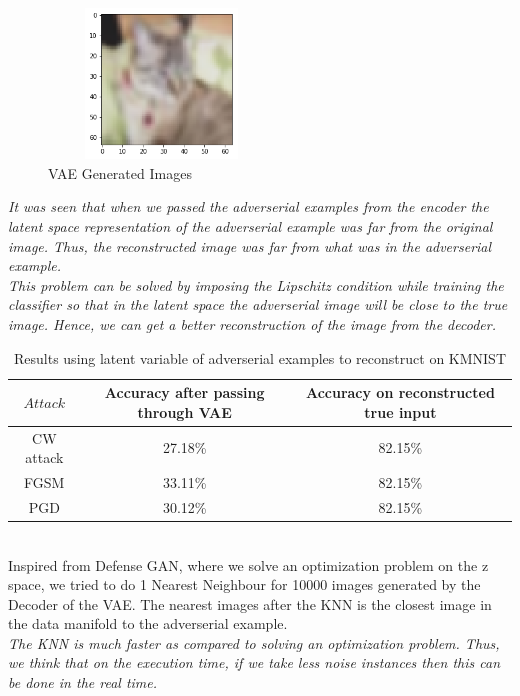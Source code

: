 \documentclass[11pt]{article}
\begin{document}
\begin{center}
        \begin{figure}[!h]
        \centering
          \includegraphics[width=60mm, height=40mm]{vae_cifar10_1.png}
          \caption{ VAE Generated Images
          }
          \label{fig:Piston}
        \end{figure}
\end{center}
\emph{It was seen that when we passed the adverserial examples from the encoder the latent space representation of the adverserial example was far from the original image. Thus, the reconstructed image was far from what was in the adverserial example.} \\
\emph{This problem can be solved by imposing the Lipschitz condition while training the classifier so that in the latent space the adverserial image will be close to the true image. Hence, we can get a better reconstruction of the image from the decoder.}\\
\pagebreak
\begin{table}[!h]
\centering
\begin{tabular}{c|c|c}
$Attack$& Accuracy after passing through VAE & Accuracy on reconstructed true input\\\hline
CW attack	& 27.18\% & 82.15\% \\
FGSM & 33.11\%  & 82.15\% \\
PGD & 30.12\%  & 82.15\% 
\end{tabular}
\caption{\label{Table 1: } Results using latent variable of adverserial examples to reconstruct on KMNIST }
\end{table}
\\

Inspired from Defense GAN, where we solve an optimization problem on the z space\cite{ref5}, we tried to do 1 Nearest Neighbour for 10000 images generated by the Decoder of the VAE. The nearest images after the KNN is the closest image in the data manifold to the adverserial example.\\
\emph{The KNN is much faster as compared to solving an optimization problem. Thus, we think that on the execution time, if we take less noise instances then this can be done in the real time.}
\end{document}
